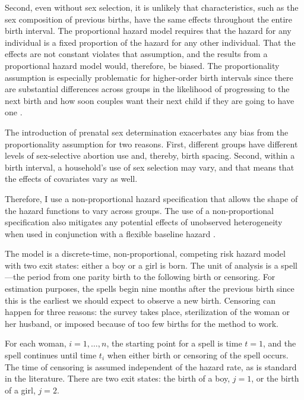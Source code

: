 \documentclass[12pt,letterpaper]{article}
\begin{document}
Second, even without sex selection, it is unlikely that characteristics, such as 
the sex composition of previous births, have the same effects throughout the entire 
birth interval. 
The proportional hazard model requires that the hazard for any individual is a 
fixed proportion of the hazard for any other individual. 
That the effects are not constant violates that assumption, and the results from a 
proportional hazard model would, therefore, be biased. 
The proportionality assumption is especially problematic for higher-order birth 
intervals since there are substantial differences across groups in the likelihood 
of progressing to the next birth and how soon couples want their next child if they 
are going to have one \citep{Whitworth2002,Bhalotra2008,Kim2010}.

The introduction of prenatal sex determination exacerbates any bias from
the proportionality assumption for two reasons. 
First, different groups have different levels of sex-selective abortion use and, thereby, 
birth spacing. 
Second, within a birth interval, a household's use of sex selection may vary, and that
means that the effects of covariates vary as well.

Therefore, I use a non-proportional hazard specification that allows the shape of the 
hazard functions to vary across groups.
The use of a non-proportional specification also mitigates any potential effects 
of unobserved heterogeneity when used in conjunction with a flexible baseline hazard 
\citep{Dolton1995}.

The model is a discrete-time, non-proportional, competing risk hazard model with two 
exit states: either a boy or a girl is born. 
The unit of analysis is a spell---the period from one parity birth to the following 
birth or censoring. 
For estimation purposes, the spells begin nine months after the previous birth since 
this is the earliest we should expect to observe a new birth. 
Censoring can happen for three reasons: the survey takes place, sterilization of the 
woman or her husband, or imposed because of too few births for the method to work.

For each woman, $i=1,\ldots,n$, the starting point for a spell is time $t=1$, and 
the spell continues until time $t_i$ when either birth or censoring of the spell 
occurs.
The time of censoring is assumed independent of the hazard rate,
as is standard in the literature.
There are two exit states: the birth of a boy, $j=1$, or the birth of a girl, $j=2$.
\end{document}
